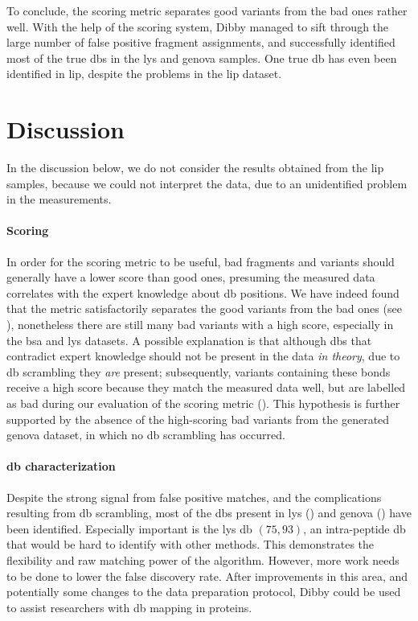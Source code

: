 To conclude, the scoring metric separates good variants from the bad ones rather well. With the help of the scoring system, Dibby managed to sift through the large number of false positive fragment assignments, and successfully identified most of the true \glspl*{db} in the \gls*{lys} and \gls*{genova} samples. One true \gls*{db} has even been identified in \gls*{lip}, despite the problems in the \gls*{lip} dataset.


\section{Discussion}

In the discussion below, we do not consider the results obtained from the \gls*{lip} samples, because we could not interpret the data, due to an unidentified problem in the measurements.

\paragraph{Scoring} In order for the scoring metric to be useful, bad fragments and variants should generally have a lower score than good ones, presuming the measured data correlates with the expert knowledge about \gls*{db} positions. We have indeed found that the metric satisfactorily separates the good variants from the bad ones (see ), nonetheless there are still many bad variants with a high score, especially in the \gls*{bsa} and \gls*{lys} datasets. A possible explanation is that although \glspl*{db} that contradict expert knowledge should not be present in the data \emph{in theory}, due to \gls*{db} scrambling they \emph{are} present; subsequently, variants containing these bonds receive a high score because they match the measured data well, but are labelled as bad during our evaluation of the scoring metric (). This hypothesis is further supported by the absence of the high-scoring bad variants from the generated \gls*{genova} dataset, in which no \gls*{db} scrambling has occurred.

\paragraph{\gls*{db} characterization} Despite the strong signal from false positive matches, and the complications resulting from \gls*{db} scrambling, most of the \glspl*{db} present in \gls*{lys} () and \gls*{genova} () have been identified. Especially important is the \gls*{lys} \gls*{db} \((75, 93)\), an intra-peptide \gls*{db} that would be hard to identify with other methods. This demonstrates the flexibility and raw matching power of the algorithm. However, more work needs to be done to lower the false discovery rate. After improvements in this area, and potentially some changes to the data preparation protocol, Dibby could be used to assist researchers with \gls*{db} mapping in proteins.

